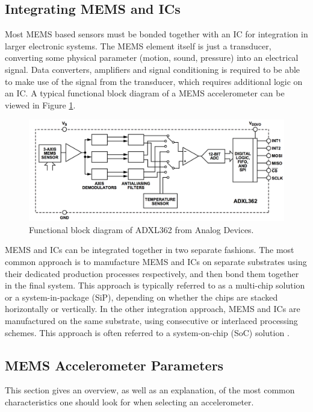 \subsection{Integrating MEMS and ICs}

Most MEMS based sensors must be bonded together with an IC for integration in larger electronic systems. The MEMS element itself is just a transducer, converting some physical parameter (motion, sound, pressure) into an electrical signal. Data converters, amplifiers and signal conditioning is required to be able to make use of the signal from the transducer, which requires additional logic on an IC. A typical functional block diagram of a MEMS accelerometer can be viewed in Figure \ref{fig:ADXL362_functional}. 

\begin{figure}[h]
\centering
\includegraphics[scale=0.5]{fig/ADXL362_functional_block.png}
\caption{Functional block diagram of ADXL362 from Analog Devices.}
\label{fig:ADXL362_functional}
\end{figure}

MEMS and ICs can be integrated together in two separate fashions. The most common approach is to manufacture MEMS and ICs on separate substrates using their dedicated production processes respectively, and then bond them together in the final system. This approach is typically referred to as a multi-chip solution or a system-in-package (SiP), depending on whether the chips are stacked horizontally or vertically. In the other integration approach, MEMS and ICs are manufactured on the same substrate, using consecutive or interlaced processing schemes. This approach is often referred to a system-on-chip (SoC) solution \cite{fischer15}. 

\subsection{MEMS Accelerometer Parameters}

This section gives an overview, as well as an explanation, of the most common characteristics one should look for when selecting an accelerometer.


